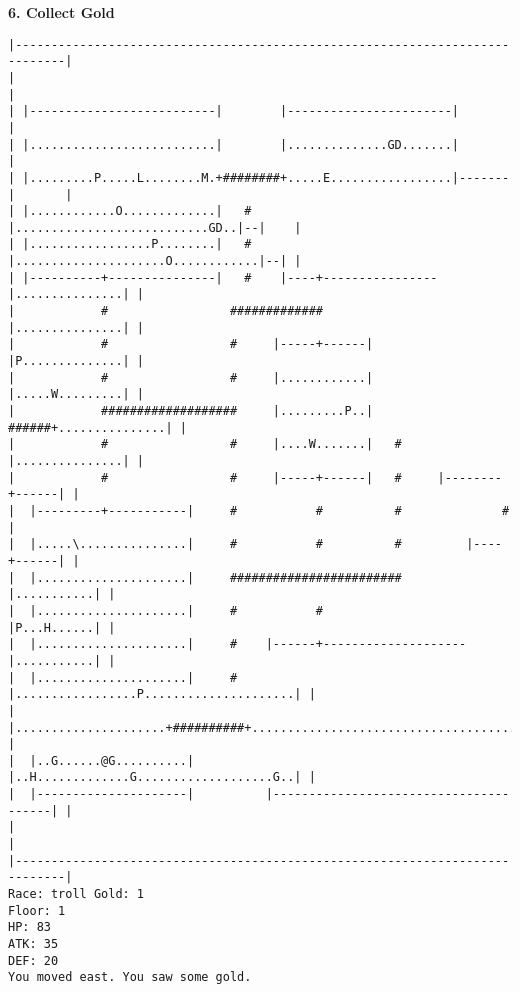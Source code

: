\documentclass[11pt]{article}
\theoremstyle{plain}
\begin{document}
\textbf{6. Collect Gold}

\begin{Verbatim}[fontsize=\small]
|-----------------------------------------------------------------------------|
|                                                                             |
| |--------------------------|        |-----------------------|               |
| |..........................|        |..............GD.......|               |
| |.........P.....L........M.+########+.....E.................|-------|       |
| |............O.............|   #    |...........................GD..|--|    |
| |.................P........|   #    |.....................O............|--| |
| |----------+---------------|   #    |----+----------------|...............| |
|            #                 #############                |...............| |
|            #                 #     |-----+------|         |P..............| |
|            #                 #     |............|         |.....W.........| |
|            ###################     |.........P..|   ######+...............| |
|            #                 #     |....W.......|   #     |...............| |
|            #                 #     |-----+------|   #     |--------+------| |
|  |---------+-----------|     #           #          #              #        |
|  |.....\...............|     #           #          #         |----+------| |
|  |.....................|     ########################         |...........| |
|  |.....................|     #           #                    |P...H......| |
|  |.....................|     #    |------+--------------------|...........| |
|  |.....................|     #    |.................P.....................| |
|  |.....................+##########+.......................................| |
|  |..G......@G..........|          |..H.............G...................G..| |
|  |---------------------|          |---------------------------------------| |
|                                                                             |
|-----------------------------------------------------------------------------|
Race: troll Gold: 1                                                    Floor: 1
HP: 83
ATK: 35
DEF: 20
You moved east. You saw some gold. 
\end{Verbatim}
\end{document}
